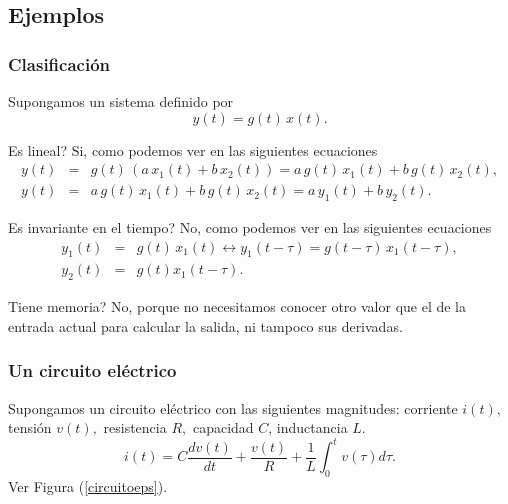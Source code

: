 \subsection{Ejemplos}

\subsubsection{Clasificaci\'{o}n}

Supongamos un sistema definido por
\begin{equation}
  y(t)=g(t) \, x\left( t\right) .
\end{equation}

\textquestiondown Es lineal?  Si, como podemos ver en las siguientes
ecuaciones
\begin{eqnarray}
  y(t) &=& g(t) \, \left( a \, x_{1}(t)+b \, x_{2}(t)\right) =a \, g(t) \, x_{1}(t)+b \, g(t) \, x_{2}(t),    \\
  y(t) &=& a \, g(t) \, x_{1}(t)+b \, g(t) \, x_{2}(t)=a \, y_{1}(t)+b \, y_{2}(t).
\end{eqnarray}

\textquestiondown Es invariante en el tiempo?  No, como podemos ver en
las siguientes ecuaciones
\begin{eqnarray}
  y_{1}\left( t\right) &=&g\left( t\right) \, x_{1}\left( t\right) 
  \longleftrightarrow 
  y_{1}\left( t-\tau \right) =g\left( t-\tau \right) \, x_{1}\left( t-\tau \right) , \\
  y_{2}\left( t\right) &=&g\left( t\right) x_{1}\left( t-\tau \right) .
\end{eqnarray}

\textquestiondown Tiene memoria?  No, porque no necesitamos conocer
otro valor que el de la entrada actual para calcular la salida, ni
tampoco sus derivadas.

\subsubsection{Un circuito el\'{e}ctrico}

Supongamos un circuito el\'{e}ctrico con las siguientes magnitudes:
corriente $i(t),$ tensi\'{o}n $v(t),$ resistencia $R,$ capacidad $C$,
inductancia $L$.
\begin{equation}
  i\left( t\right) =
  C\frac{dv\left( t\right) }{dt}+
  \frac{v\left( t\right) }{R}+
  \frac{1}{L}\int_{0}^{t}v\left( \tau \right) d\tau .             \label{rlc}
\end{equation}
Ver Figura (\ref{circuitoeps}).

